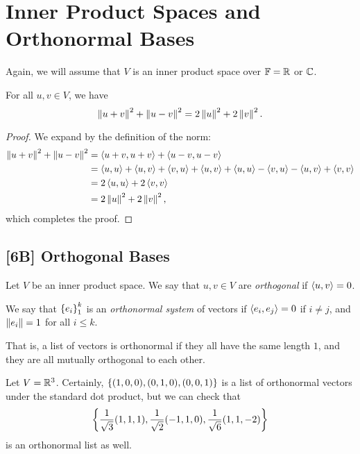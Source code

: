 \documentclass{article}
\begin{document}
\section{Inner Product Spaces and Orthonormal Bases}
Again, we will assume that $V$ is an inner product space over $\mathbb F = \mathbb R$ or $\mathbb C$.
\begin{theorem}
For all $u,v\in V$, we have
$$\left\Vert u+v\right\Vert^2 + \left\Vert u-v\right\Vert^2 = 2\left\Vert u\right\Vert^2 + 2\left\Vert v\right\Vert^2.$$
\begin{center}
\end{center}
\end{theorem}
\begin{proof}
We expand by the definition of the norm:
\begin{align*}
\left\Vert u+v\right\Vert^2 + \left\Vert u-v\right\Vert^2 &= \left\langle u+v, u+v\right\rangle + \left\langle u-v, u-v\right\rangle \\
&= \left\langle u,u\right\rangle + \left\langle u,v\right\rangle + \left\langle v,u\right\rangle + \left\langle u,v\right\rangle + \left\langle u,u\right\rangle - \left\langle v,u\right\rangle - \left\langle u,v\right\rangle + \left\langle v,v\right\rangle \\
&= 2\left\langle u,u\right\rangle + 2\left\langle v,v\right\rangle \\
&= 2\left\Vert u\right\Vert^2 + 2\left\Vert v\right\Vert^2,
\end{align*}
which completes the proof.
\end{proof}
\subsection*{[6B] Orthogonal Bases}
\begin{definition}
Let $V$ be an inner product space. We say that $u,v \in V$ are \textit{orthogonal} if $\left\langle u,v\right\rangle = 0$.
\end{definition}
\begin{definition}
We say that $\left\{e_i\right\}_1^k$ is an \textit{orthonormal system} of vectors if $\left\langle e_i, e_j\right\rangle = 0$ if $i\neq j$, and $\left\Vert e_i\right\Vert = 1$ for all $i\leq k$.
\end{definition}
That is, a list of vectors is orthonormal if they all have the same length $1$, and they are all mutually orthogonal to each other.
\begin{example}
Let $V = \mathbb R^3$. Certainly, $\left\{(1,0,0), (0,1,0), (0,0,1)\right\}$ is a list of orthonormal vectors under the standard dot product, but we can check that
$$\left\{\frac 1{\sqrt 3}(1,1,1), \frac 1{\sqrt 2}(-1, 1, 0), \frac 1{\sqrt 6}(1,1,-2)\right\}$$
is an orthonormal list as well.
\end{example}
\end{document}
